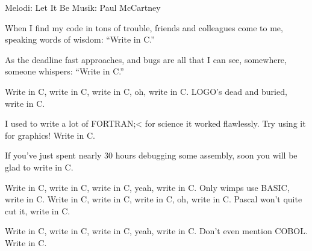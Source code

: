 \begin{song}

\begin{songmeta}
Melodi: Let It Be
Musik: Paul McCartney
\end{songmeta}

\begin{songtext}
When I find my code in tons of trouble,
friends and colleagues come to me,
speaking words of wisdom: \textquotedblleft{}Write in C.\textquotedblright{}

As the deadline fast approaches,
and bugs are all that I can see,
somewhere, someone whispers: \textquotedblleft{}Write in C.\textquotedblright{}

Write in C, write in C,
write in C, oh, write in C.
LOGO's dead and buried, write in C.

I used to write a lot of FORTRAN;<
for science it worked flawlessly.
Try using it for graphics! Write in C.

If you've just spent nearly 30 hours
debugging some assembly,
soon you will be glad to write in C.

Write in C, write in C,
write in C, yeah, write in C.
Only wimps use BASIC, write in C.
\newpage
Write in C, write in C,
write in C, oh, write in C.
Pascal won't quite cut it, write in C.

Write in C, write in C,
write in C, yeah, write in C.
Don't even mention COBOL. Write in C.
\end{songtext}
\end{song}
